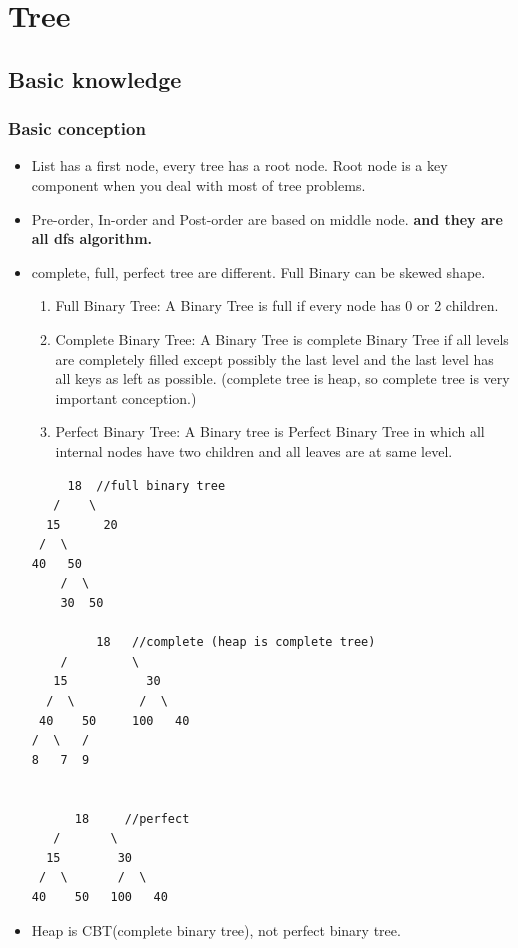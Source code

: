 \documentclass[a4paper,11pt,twoside]{book}
\begin{document}
\section{Tree}
\subsection{Basic knowledge}
\subsubsection{Basic conception}
\begin{itemize}
\item List has a first node, every tree has a root node. Root node is a key component when you deal with most of tree problems.  

\item Pre-order, In-order and Post-order are based on middle node. \textbf{and they are all dfs algorithm.}

\item complete, full, perfect tree are different. Full Binary can be skewed shape. 
\begin{enumerate}
	\item Full Binary Tree: A Binary Tree is full if every node has 0 or 2 children. 
	
	
	\item Complete Binary Tree: A Binary Tree is complete Binary Tree if all levels are completely filled except possibly the last level and the last level has all keys as left as possible. (complete tree is heap, so complete tree is very important conception.)
	
	\item Perfect Binary Tree: A Binary tree is Perfect Binary Tree in which all internal nodes have two children and all leaves are at same level.
\end{enumerate}
	
\begin{verbatim}
     18  //full binary tree
   /    \   
  15      20    
 /  \       
40   50   
	/  \
	30  50
	
         18   //complete (heap is complete tree)
    /         \  
   15           30  
  /  \         /  \
 40    50     100   40
/  \   /
8   7  9 
	
	
      18     //perfect 
   /       \  
  15        30  
 /  \       /  \
40    50   100   40
\end{verbatim}


\item Heap is CBT(complete binary tree), not perfect binary tree. 


\end{itemize}
\end{document}
